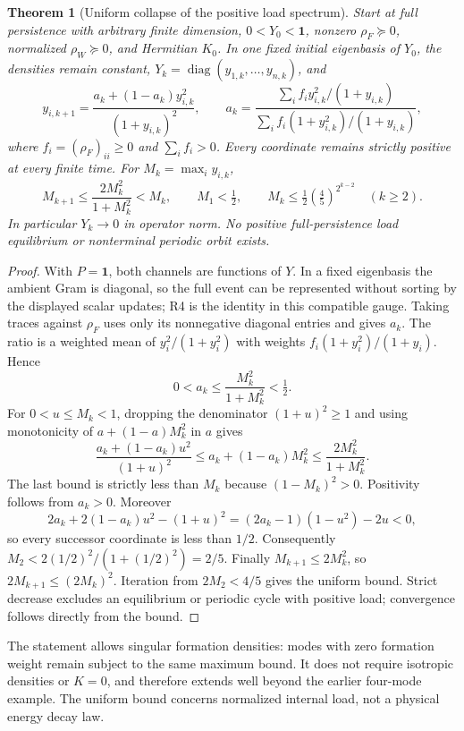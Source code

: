 \documentclass[11pt,letterpaper]{article}
\newcommand{\diag}{\operatorname{diag}}
\newcommand{\Id}{\mathbf 1}
\newtheorem{theorem}{Theorem}[section]
\theoremstyle{definition}
\numberwithin{equation}{section}
\begin{document}
\begin{theorem}[Uniform collapse of the positive load spectrum]\label{globalcollapse}
Start at full persistence with arbitrary finite dimension, $0<Y_0<\Id$, nonzero $\rho_F\succeq0$, normalized $\rho_W\succeq0$, and Hermitian $K_0$. In one fixed initial eigenbasis of $Y_0$, the densities remain constant, $Y_k=\diag(y_{1,k},\ldots,y_{n,k})$, and
\begin{equation}\label{generalF}
y_{i,k+1}=\frac{a_k+(1-a_k)y_{i,k}^2}{(1+y_{i,k})^2},\qquad
a_k=\frac{\sum_i f_i y_{i,k}^2/(1+y_{i,k})}{\sum_i f_i(1+y_{i,k}^2)/(1+y_{i,k})},
\end{equation}
where $f_i=(\rho_F)_{ii}\geq0$ and $\sum_i f_i>0$. Every coordinate remains strictly positive at every finite time. For $M_k=\max_i y_{i,k}$,
\begin{equation}\label{collapsebound}
M_{k+1}\leq\frac{2M_k^2}{1+M_k^2}<M_k,\qquad M_1<\tfrac12,
\qquad M_k\leq\tfrac12(\tfrac45)^{2^{k-2}}\quad(k\geq2).
\end{equation}
In particular $Y_k\to0$ in operator norm. No positive full-persistence load equilibrium or nonterminal periodic orbit exists.
\end{theorem}
\begin{proof}
With $P=\Id$, both channels are functions of $Y$. In a fixed eigenbasis the ambient Gram is diagonal, so the full event can be represented without sorting by the displayed scalar updates; R4 is the identity in this compatible gauge. Taking traces against $\rho_F$ uses only its nonnegative diagonal entries and gives $a_k$. The ratio is a weighted mean of $y_i^2/(1+y_i^2)$ with weights $f_i(1+y_i^2)/(1+y_i)$. Hence
\begin{equation}
0<a_k\leq\frac{M_k^2}{1+M_k^2}<\tfrac12.
\end{equation}
For $0<u\leq M_k<1$, dropping the denominator $(1+u)^2\geq1$ and using monotonicity of $a+(1-a)M_k^2$ in $a$ gives
\begin{equation}
\frac{a_k+(1-a_k)u^2}{(1+u)^2}
\leq a_k+(1-a_k)M_k^2
\leq\frac{2M_k^2}{1+M_k^2}.
\end{equation}
The last bound is strictly less than $M_k$ because $(1-M_k)^2>0$. Positivity follows from $a_k>0$. Moreover
\begin{equation}
2a_k+2(1-a_k)u^2-(1+u)^2
=(2a_k-1)(1-u^2)-2u<0,
\end{equation}
so every successor coordinate is less than $1/2$. Consequently $M_2<2(1/2)^2/(1+(1/2)^2)=2/5$. Finally $M_{k+1}\leq2M_k^2$, so $2M_{k+1}\leq(2M_k)^2$. Iteration from $2M_2<4/5$ gives the uniform bound. Strict decrease excludes an equilibrium or periodic cycle with positive load; convergence follows directly from the bound.
\end{proof}
The statement allows singular formation densities: modes with zero formation weight remain subject to the same maximum bound. It does not require isotropic densities or $K=0$, and therefore extends well beyond the earlier four-mode example. The uniform bound concerns normalized internal load, not a physical energy decay law.
\end{document}
